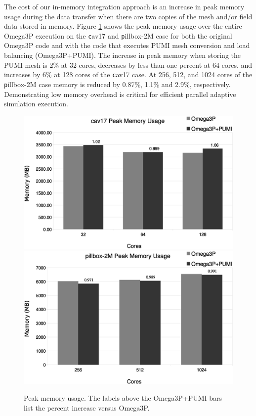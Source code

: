 \documentclass[a4paper]{article}
\begin{document}
The cost of our in-memory integration approach is an increase in peak memory
usage during the data transfer when there are two copies of the mesh and/or
field data stored in memory.
Figure \ref{fig:memusage} shows the peak memory usage over the entire Omega3P
execution on the {\texttt cav17} and {\texttt pillbox-2M} case for both the
original Omega3P code and with the code that executes PUMI mesh conversion and
load balancing (Omega3P+PUMI).
The increase in peak memory when storing the PUMI mesh is 2\% at 32 cores,
decreases by less than one percent at 64 cores, and increases by 6\% at 128
cores of the {\texttt cav17} case.
At 256, 512, and 1024 cores of the {\texttt pillbox-2M} case memory is reduced by
0.87\%, 1.1\% and 2.9\%, respectively.
Demonstrating low memory overhead is critical for efficient parallel adaptive
simulation execution.

\begin{figure}[ht]
\centering
  \includegraphics[width=\textwidth]{cav17-peak-mem.eps}
  \includegraphics[width=\textwidth]{pillbox2M-peak-mem.eps}
  \caption{\label{fig:memusage} Peak memory usage. The labels above the Omega3P+PUMI bars
  list the percent increase versus Omega3P.}
\end{figure}
\end{document}
